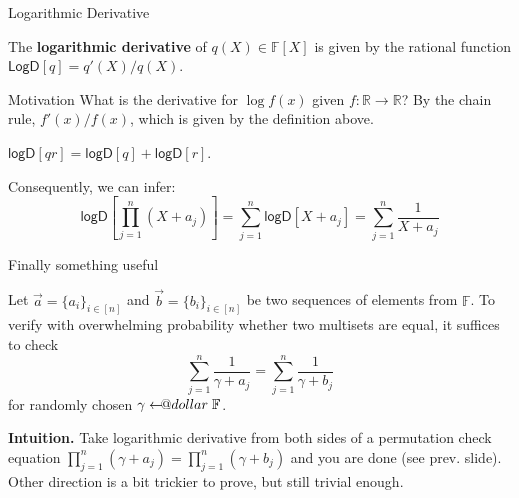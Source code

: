 \documentclass{zkdl-presentation-template}
\makeatletter
\newcommand\leftarrowS{\leftarrow\joinrel\smalldollar}
\newcommand{\smalldollar}{\mathrel{\mathpalette\small@dollar\relax}}
\newcommand{\small@dollar}[2]{%
  \vcenter{\hbox{%
    $#1\textnormal{\fontsize{0.7\dimexpr\f@size pt}{0}\selectfont\$}$%
  }}%
}
\makeatother
\begin{document}
    \begin{frame}{Logarithmic Derivative}
        \begin{definition}
            The \textbf{logarithmic derivative} of $q(X) \in \mathbb{F}[X]$ is given by the 
            rational function $\mathsf{LogD}[q] = q'(X)/q(X)$.\pause
        \end{definition}
        \begin{alertblock}{Motivation}
            What is the derivative for $\log f(x)$ given $f: \mathbb{R} \to
            \mathbb{R}$?\pause \hspace{1px} By the chain rule, $f'(x)/f(x)$, which is given by
            the definition above.\pause
        \end{alertblock}

        \begin{lemma}
            $\mathsf{logD}[qr]=\mathsf{logD}[q] + \mathsf{logD}[r]$.\pause
        \end{lemma}

        Consequently, we can infer:
        \begin{equation*}
            \mathsf{logD}\left[\prod_{j=1}^n (X+a_j)\right] = \sum_{j=1}^n \mathsf{logD}\left[X+a_j\right] = \sum_{j=1}^n \frac{1}{X+a_j}
        \end{equation*}
    \end{frame}

    \begin{frame}{Finally something useful}
        \begin{theorem}
            Let $\vec{a} = \{a_i\}_{i \in [n]}$ and $\vec{b} = \{b_i\}_{i \in [n]}$ be
            two sequences of elements from $\mathbb{F}$. To verify with overwhelming
            probability whether two multisets are equal, it suffices to check
            \begin{equation*}
                \sum_{j=1}^n \frac{1}{\gamma + a_j} = \sum_{j=1}^n \frac{1}{\gamma+b_j}
            \end{equation*}
            for randomly chosen $\gamma \leftarrowS \mathbb{F}$.\pause
        \end{theorem}

        \textbf{Intuition.} Take logarithmic derivative from both sides of a
        permutation check equation $\prod_{j=1}^n (\gamma+a_j) = \prod_{j=1}^n
        (\gamma+b_j)$ and you are done (see prev. slide). Other direction is a
        bit trickier to prove, but still trivial enough.
    \end{frame}
\end{document}
